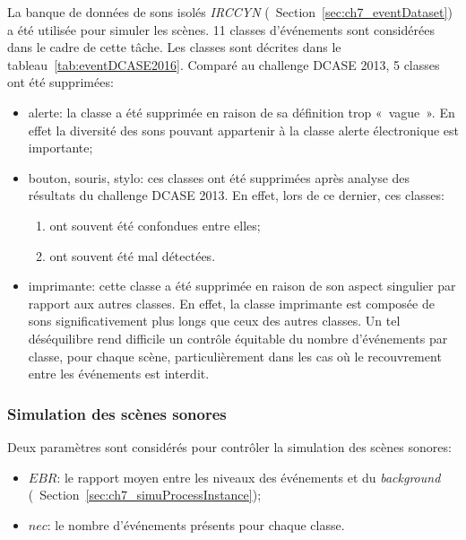 La banque de données de sons isolés \emph{IRCCYN} (\cf~Section~\ref{sec:ch7_eventDataset}) a été utilisée pour simuler les scènes. 11 classes d'événements sont considérées dans le cadre de cette tâche. Les classes sont décrites dans le tableau~\ref{tab:eventDCASE2016}. Comparé au challenge DCASE 2013, 5 classes ont été supprimées:

\begin{itemize}
\item alerte: la classe a été supprimée en raison de sa définition trop «~vague~». En effet la diversité des sons pouvant appartenir à la classe alerte électronique est importante;

\item bouton, souris, stylo: ces classes ont été supprimées après analyse des résultats du challenge DCASE 2013. En effet, lors de ce dernier, ces classes:

\begin{enumerate}
\item ont souvent été confondues entre elles;
\item ont souvent été mal détectées. 
\end{enumerate}

\item imprimante: cette classe a été supprimée en raison de son aspect singulier par rapport aux autres classes. En effet, la classe imprimante est composée de sons significativement plus longs que ceux des autres classes. Un tel déséquilibre rend difficile un contrôle équitable du nombre d'événements par classe, pour chaque scène, particulièrement dans les cas où le recouvrement entre les événements est interdit.

\end{itemize}

\subsubsection{Simulation des scènes sonores}
\label{sec:ch7_simulationDcase2016}

Deux paramètres sont considérés pour contrôler la simulation des scènes sonores:

\begin{itemize}
\item $EBR$: le rapport moyen entre les niveaux des événements et du \emph{background} (\cf~Section~\ref{sec:ch7_simuProcessInstance});
\item $nec$: le nombre d'événements présents pour chaque classe.
\end{itemize}

